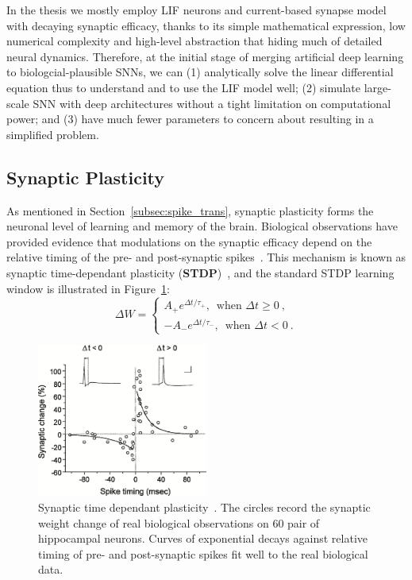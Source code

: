 In the thesis we mostly employ LIF neurons and current-based synapse model with decaying synaptic efficacy, thanks to its simple mathematical expression, low numerical complexity and high-level abstraction that hiding much of detailed neural dynamics.
Therefore, at the initial stage of merging artificial deep learning to biologcial-plausible SNNs, we can (1) analytically solve the linear differential equation thus to understand and to use the LIF model well; (2) simulate large-scale SNN with deep architectures without a tight limitation on computational power; and (3) have much fewer parameters to concern about resulting in a simplified problem.


\subsection{Synaptic Plasticity}
\label{subsec:STDP}
As mentioned in Section~\ref{subsec:spike_trans}, synaptic plasticity forms the neuronal level of learning and memory of the brain.
Biological observations have provided evidence that modulations on the synaptic efficacy depend on the relative timing of the pre- and post-synaptic spikes~\cite{bi1998synaptic}.
This mechanism is known as synaptic time-dependant plasticity (\textbf{STDP})~\cite{song2000competitive}, and the standard STDP learning window is illustrated in Figure~\ref{Fig:STDP}:
\begin{equation}
\Delta W = \left\{
\begin{aligned}
A_+ e^{\Delta t/\tau_+} \textrm{,~~when~} \Delta t \geq 0~, \\
-A_- e^{\Delta t/\tau_-} \textrm{,~~when~} \Delta t < 0~.
\end{aligned}
\right.
\label{equ:stdp}
\end{equation}

\begin{figure}[bt!]
	\centering
	\includegraphics[width=0.5\textwidth]{pics_snn/stdp.jpeg}
	\caption{Synaptic time dependant plasticity~\cite{bi2001synaptic}.
	The circles record the synaptic weight change of real biological observations on 60 pair of hippocampal neurons.
	Curves of exponential decays against relative timing of pre- and post-synaptic spikes fit well to the real biological data.
	}
	\label{Fig:STDP}
\end{figure}

